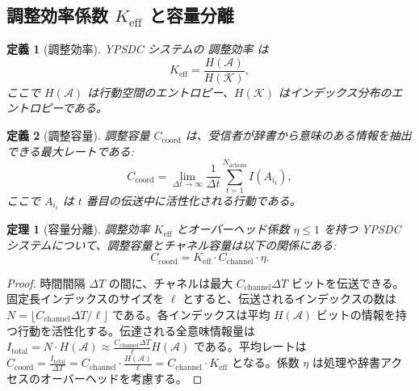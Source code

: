 \documentclass[12pt,a4paper]{ltjsarticle}
\newtheorem{definition}{定義}
\newtheorem{theorem}{定理}
\begin{document}
	\subsection{調整効率係数 \(K_{\mathrm{eff}}\) と容量分離}
	
	\begin{definition}[調整効率]
		YPSDC システムの \emph{調整効率} は
		\begin{equation}
			K_{\mathrm{eff}} = \frac{H(\mathcal{A})}{H(\mathcal{K})},
			\label{eq:Kdef}
		\end{equation}
		ここで \(H(\mathcal{A})\) は行動空間のエントロピー、\(H(\mathcal{K})\) はインデックス分布のエントロピーである。
	\end{definition}
	
	\begin{definition}[調整容量]
		\emph{調整容量} \(C_{\mathrm{coord}}\) は、受信者が辞書から意味のある情報を抽出できる最大レートである:
		\begin{equation}
			C_{\mathrm{coord}} = \lim_{\Delta t \to \infty} \frac{1}{\Delta t} \sum_{t=1}^{N_{\mathrm{actions}}} I(A_{i_t}),
		\end{equation}
		ここで \(A_{i_t}\) は $t$ 番目の伝送中に活性化される行動である。
	\end{definition}
	
	\begin{theorem}[容量分離]
		\label{thm:capacity-separation}
		調整効率 \(K_{\mathrm{eff}}\) とオーバーヘッド係数 \(\eta \le 1\) を持つ YPSDC システムについて、調整容量とチャネル容量は以下の関係にある:
		\begin{equation}
			\boxed{C_{\mathrm{coord}} = K_{\mathrm{eff}} \cdot C_{\mathrm{channel}} \cdot \eta}.
			\label{eq:capacity-separation}
		\end{equation}
	\end{theorem}
	
	\begin{proof}
		時間間隔 \(\Delta T\) の間に、チャネルは最大 \(C_{\mathrm{channel}} \Delta T\) ビットを伝送できる。固定長インデックスのサイズを \(\ell\) とすると、伝送されるインデックスの数は \(N = \lfloor C_{\mathrm{channel}} \Delta T / \ell \rfloor\) である。各インデックスは平均 \(H(\mathcal{A})\) ビットの情報を持つ行動を活性化する。伝達される全意味情報量は \(I_{\mathrm{total}} = N \cdot H(\mathcal{A}) \approx \frac{C_{\mathrm{channel}} \Delta T}{\ell} H(\mathcal{A})\) である。平均レートは \(C_{\mathrm{coord}} = \frac{I_{\mathrm{total}}}{\Delta T} = C_{\mathrm{channel}} \cdot \frac{H(\mathcal{A})}{\ell} = C_{\mathrm{channel}} \cdot K_{\mathrm{eff}}\) となる。係数 \(\eta\) は処理や辞書アクセスのオーバーヘッドを考慮する。
	\end{proof}
	
\end{document}
